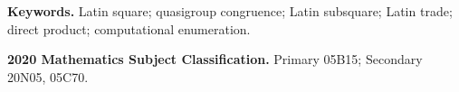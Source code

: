 \documentclass[11pt]{article}
\theoremstyle{definition}
\theoremstyle{remark}
\begin{document}
\noindent\textbf{Keywords.}
Latin square; quasigroup congruence; Latin subsquare; Latin trade; direct
product; computational enumeration.

\medskip
\noindent\textbf{2020 Mathematics Subject Classification.}
Primary 05B15; Secondary 20N05, 05C70.











\footnotesize


\end{document}

